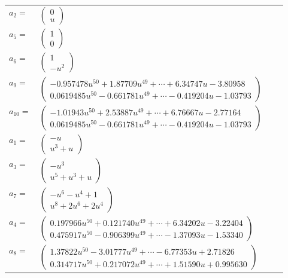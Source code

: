 \documentclass[1p]{elsarticle_modified}
\theoremstyle{definition}
\begin{document}
\begin{tabular}{m{7pt} m{180pt} m{7pt} m{180pt} }
\flushright $a_{2}=$&$\begin{pmatrix}0\\u\end{pmatrix}$ \\
\flushright $a_{5}=$&$\begin{pmatrix}1\\0\end{pmatrix}$ \\
\flushright $a_{6}=$&$\begin{pmatrix}1\\- u^2\end{pmatrix}$ \\
\flushright $a_{9}=$&$\begin{pmatrix}-0.957478 u^{50}+1.87709 u^{49}+\cdots+6.34747 u-3.80958\\0.0619485 u^{50}-0.661781 u^{49}+\cdots-0.419204 u-1.03793\end{pmatrix}$ \\
\flushright $a_{10}=$&$\begin{pmatrix}-1.01943 u^{50}+2.53887 u^{49}+\cdots+6.76667 u-2.77164\\0.0619485 u^{50}-0.661781 u^{49}+\cdots-0.419204 u-1.03793\end{pmatrix}$ \\
\flushright $a_{1}=$&$\begin{pmatrix}- u\\u^3+u\end{pmatrix}$ \\
\flushright $a_{3}=$&$\begin{pmatrix}- u^3\\u^5+u^3+u\end{pmatrix}$ \\
\flushright $a_{7}=$&$\begin{pmatrix}- u^6- u^4+1\\u^8+2 u^6+2 u^4\end{pmatrix}$ \\
\flushright $a_{4}=$&$\begin{pmatrix}0.197966 u^{50}+0.121740 u^{49}+\cdots+6.34202 u-3.22404\\0.475917 u^{50}-0.906399 u^{49}+\cdots-1.37093 u-1.53340\end{pmatrix}$ \\
\flushright $a_{8}=$&$\begin{pmatrix}1.37822 u^{50}-3.01777 u^{49}+\cdots-6.77353 u+2.71826\\0.314717 u^{50}+0.217072 u^{49}+\cdots+1.51590 u+0.995630\end{pmatrix}$ \\

\end{tabular}
\end{document}
